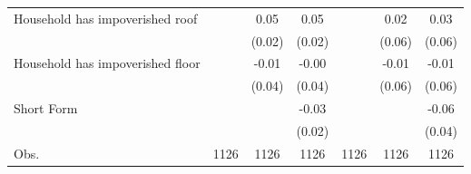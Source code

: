{\begin{tabular}{l*{6}{c}}
Household has impoverished roof&                     &        0.05\sym{**} &        0.05\sym{**} &                     &        0.02         &        0.03         \\
                    &                     &      (0.02)         &      (0.02)         &                     &      (0.06)         &      (0.06)         \\
Household has impoverished floor&                     &       -0.01         &       -0.00         &                     &       -0.01         &       -0.01         \\
                    &                     &      (0.04)         &      (0.04)         &                     &      (0.06)         &      (0.06)         \\
Short Form          &                     &                     &       -0.03         &                     &                     &       -0.06         \\
                    &                     &                     &      (0.02)         &                     &                     &      (0.04)         \\
\hline
Obs.                &        1126         &        1126         &        1126         &        1126         &        1126         &        1126         \\
\hline\hline
\end{tabular}
}
